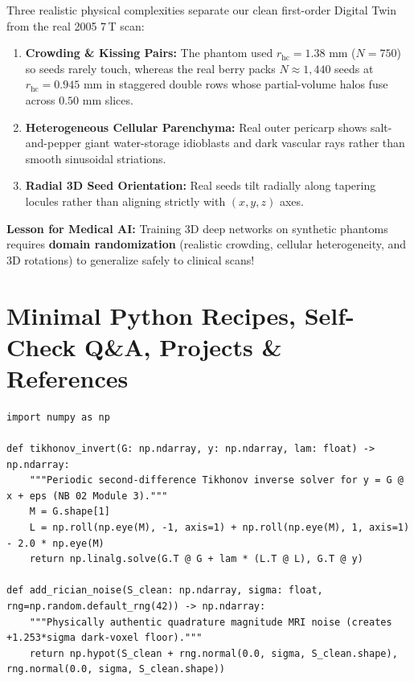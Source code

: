 \documentclass[10.5pt,a4paper]{article}
\begin{document}
\begin{warningbox}
Three realistic physical complexities separate our clean first-order Digital Twin from the real 2005 7\,T scan:
\begin{enumerate}
    \item \textbf{Crowding \& Kissing Pairs:} The phantom used $r_{\text{hc}} = 1.38\text{ mm}$ ($N=750$) so seeds rarely touch, whereas the real berry packs $N\approx 1{,}440$ seeds at $r_{\text{hc}} = 0.945\text{ mm}$ in staggered double rows whose partial-volume halos fuse across $0.50\text{ mm}$ slices.
    \item \textbf{Heterogeneous Cellular Parenchyma:} Real outer pericarp shows salt-and-pepper giant water-storage idioblasts and dark vascular rays rather than smooth sinusoidal striations.
    \item \textbf{Radial 3D Seed Orientation:} Real seeds tilt radially along tapering locules rather than aligning strictly with $(x, y, z)$ axes.
\end{enumerate}
\textbf{Lesson for Medical AI:} Training 3D deep networks on synthetic phantoms requires \textbf{domain randomization} (realistic crowding, cellular heterogeneity, and 3D rotations) to generalize safely to clinical scans!
\end{warningbox}

\section{Minimal Python Recipes, Self-Check Q\&A, Projects \& References}

\begin{lstlisting}[style=pybmed]
import numpy as np

def tikhonov_invert(G: np.ndarray, y: np.ndarray, lam: float) -> np.ndarray:
    """Periodic second-difference Tikhonov inverse solver for y = G @ x + eps (NB 02 Module 3)."""
    M = G.shape[1]
    L = np.roll(np.eye(M), -1, axis=1) + np.roll(np.eye(M), 1, axis=1) - 2.0 * np.eye(M)
    return np.linalg.solve(G.T @ G + lam * (L.T @ L), G.T @ y)

def add_rician_noise(S_clean: np.ndarray, sigma: float, rng=np.random.default_rng(42)) -> np.ndarray:
    """Physically authentic quadrature magnitude MRI noise (creates +1.253*sigma dark-voxel floor)."""
    return np.hypot(S_clean + rng.normal(0.0, sigma, S_clean.shape), rng.normal(0.0, sigma, S_clean.shape))
\end{lstlisting}
\end{document}

